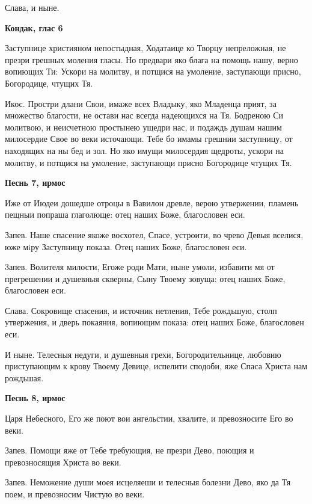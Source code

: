 Слава, и ныне.





\bfseries Кондак, глас 6\normalfont{}


Заступнице християном непостыдная, Ходатаице ко Творцу непреложная, не презри грешных моления гласы. Но предвари яко блага на помощь нашу, верно вопиющих Ти: Ускори на молитву, и потщися на умоление, заступающи присно, Богородице, чтущих Тя.


Икос. Простри длани Свои, имаже всех Владыку, яко Младенца прият, за множество благости, не остави нас всегда надеющихся на Тя. Бодреною Си молитвою, и неисчетною простынею ущедри нас, и подаждь душам нашим милосердие Свое во веки источающи. Тебе бо имамы грешнии заступницу, от находящих на ны бед и зол. Но яко имущи милосердия щедроты, ускори на молитву, и потщися на умоление, заступающи присно Богородице чтущих Тя.





\bfseries Песнь 7, ирмос\normalfont{}


Иже от Июдеи дошедше отроцы в Вавилон древле, верою утвержении, пламень пещныи попраша глаголюще: отец наших Боже, благословен еси.


Запев. Наше спасение якоже восхотел, Спасе, устроити, во чрево Девыя вселися, юже мiру Заступницу показа. Отец наших Боже, благословен еси.


3апев. Волителя милости, Егоже роди Мати, ныне умоли, избавити мя от прегрешении и душевныя скверны, Сыну Твоему зовуща: отец наших Боже, благословен еси.


Слава. Сокровище спасения, и источник нетления, Тебе рождьшую, столп утвержения, и дверь покаяния, вопиющим показа: отец наших Боже, благословен еси.


И ныне. Телесныя недуги, и душевныя грехи, Богородительнице, любовию приступающим к крову Твоему Девице, испелити сподоби, яже Спаса Христа нам рождьшая.





\bfseries Песнь 8, ирмос\normalfont{}


Царя Небесного, Его же поют вои ангельстии, хвалите, и превозносите Его во веки.


Запев. Помощи яже от Тебе требующия, не презри Дево, поющия и превозносящия Христа во веки.


Запев. Неможение души моея исцеляеши и телесныя болезни Дево, яко да Тя поем, и превозносим Чистую во веки.


